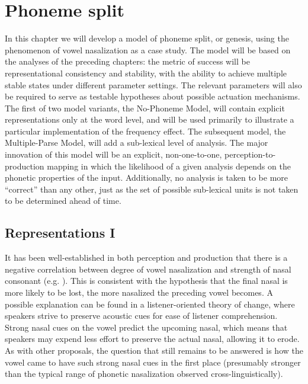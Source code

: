 \chapter{Phoneme split}\label{ch:Phoneme-Split}

In this chapter we will develop a model of phoneme split, or genesis,
using the phenomenon of vowel nasalization as a case study. The model
will be based on the analyses of the preceding chapters: the metric
of success will be representational consistency and stability, with
the ability to achieve multiple stable states under different parameter
settings. The relevant parameters will also be required to serve as
testable hypotheses about possible actuation mechanisms. The first
of two model variants, the No-Phoneme Model, will contain explicit
representations only at the word level, and will be used primarily
to illustrate a particular implementation of the frequency effect.
The subsequent model, the Multiple-Parse Model, will add a sub-lexical
level of analysis. The major innovation of this model will be an explicit,
non-one-to-one, perception-to-production mapping in which the likelihood
of a given analysis depends on the phonetic properties of the input.
Additionally, no analysis is taken to be more ``correct'' than any other,
just as the set of possible sub-lexical units is not taken to be determined
ahead of time.

\section{Representations I}

It has been well-established in both perception and production that
there is a negative correlation between degree of vowel nasalization and strength
of nasal consonant (e.g. \citealt{kawasaki1978perceived,cohn1990phonetic}).
This is consistent with the hypothesis that the final nasal is more
likely to be lost, the more nasalized the preceding vowel becomes.
A possible explanation can be found in a listener-oriented theory
of change, where speakers strive to preserve acoustic cues for ease
of listener comprehension. Strong nasal cues on the vowel predict
the upcoming nasal, which means that speakers may expend less effort
to preserve the actual nasal, allowing it to erode. As with other
proposals, the question that still remains to be answered is how the
vowel came to have such strong nasal cues in the first place (presumably
stronger than the typical range of phonetic nasalization observed
cross-linguistically). 

